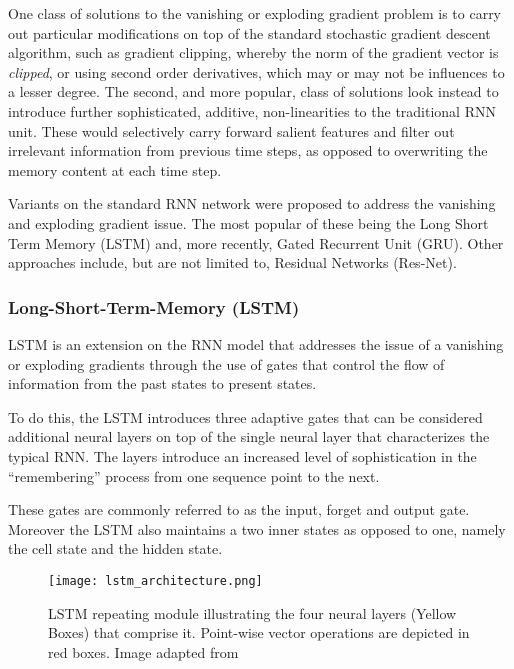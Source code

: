 \documentclass[../../fyp.tex]{subfiles}
\begin{document}
One class of solutions to the vanishing or exploding gradient problem is to carry out particular modifications on top of the standard stochastic gradient descent algorithm, such as gradient clipping, whereby the norm of the gradient vector is \textit{clipped}, or using second order derivatives, which may or may not be influences to a lesser degree. \cite{chung2014}
The second, and more popular, class of solutions look instead to introduce further sophisticated, additive, non-linearities to the traditional RNN unit. These would selectively carry forward salient features and filter out irrelevant information from previous time steps, as opposed to overwriting the memory content at each time step.

Variants on the standard RNN network were proposed to address the vanishing and exploding gradient issue. The most popular of these being the Long Short Term Memory (LSTM) and, more recently, Gated Recurrent Unit (GRU). Other approaches include, but are not limited to, Residual Networks (Res-Net).

\subsubsection{Long-Short-Term-Memory (LSTM)}
LSTM \cite{hochreiter1997} is an extension on the RNN model that addresses the issue of a vanishing or exploding gradients through the use of gates that control the flow of information from the past states to present states.

To do this, the LSTM introduces three adaptive gates that can be considered additional neural layers on top of the single neural layer that characterizes the typical RNN. The layers introduce an increased level of sophistication in the \enquote{remembering} process from one sequence point to the next.

These gates are commonly referred to as the input, forget and output gate. Moreover the LSTM also maintains a two inner states as opposed to one, namely the cell state and the hidden state.

\begin{figure}[!ht]
	\centering
	\texttt{[image: lstm\_architecture.png]}
	\caption{LSTM repeating module illustrating the four neural layers (Yellow Boxes) that comprise it. Point-wise vector operations are depicted in red boxes. Image adapted from \cite{colah-understanding-lstm}}
	\label{fig:lstm_architecture}
\end{figure}
\end{document}
